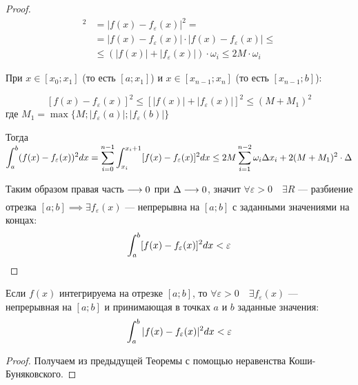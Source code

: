 \begin{proof}
    \begin{align*}
        [f(x) - f_\varepsilon(x)]^2 &= |f(x) - f_\varepsilon(x)|^2 = \\
        &= |f(x) - f_\varepsilon(x)| \cdot |f(x) - f_\varepsilon(x)| \leq \\ 
        &\leq (|f(x)| + |f_\varepsilon(x)|) \cdot \omega_i \leq 2 M \cdot \omega_i
    \end{align*}

    При $x \in [x_0; x_1]$ (то есть $[a; x_1]$) и 
    $x \in [x_{n - 1}; x_n]$ (то есть $[x_{n - 1}; b]$):

    \[ [f(x) - f_\varepsilon(x)]^2 \leq [|f(x)| + |f_\varepsilon(x)|]^2 \leq (M + M_1)^2 \]
    где $M_1 = \max \{ M; |f_\varepsilon(a)|; |f_\varepsilon(b)| \}$

    Тогда $\displaystyle\int_a^b (f(x) - f_\varepsilon(x))^2 dx = 
    \displaystyle\sum_{i = 0}^{n - 1} \displaystyle\int_{x_i}^{x_i + 1} [f(x) - f_\varepsilon(x)]^2 dx \leq
    2M \displaystyle\sum_{i = 1}^{n - 2} \omega_i \Delta x_i + 2(M + M_1)^2 \cdot \Delta$

    Таким образом правая часть $\underset{}{\longrightarrow} 0$ при $\Delta \underset{}{\longrightarrow} 0$,
    значит $\forall \varepsilon > 0 \quad \exists R$ --- разбиение отрезка
    $[a; b] \implies \exists f_\varepsilon(x)$ --- непрерывна на $[a; b]$ с
    заданными значениями на концах:
    \[ \displaystyle\int_a^b [f(x) - f_\varepsilon(x)]^2 dx < \varepsilon \]
\end{proof}

\begin{corollary}
    Если $f(x)$ интегрируема на отрезке $[a; b]$, то $\forall \varepsilon > 0
    \quad \exists f_\varepsilon(x)$ --- непрерывная на $[a; b]$ и принимающая
    в точках $a$ и $b$ заданные значения:
    \[ \displaystyle\int_a^b |f(x) - f_\varepsilon(x)|^2 dx < \varepsilon \]
\end{corollary}
\begin{proof}
    Получаем из предыдущей Теоремы с помощью неравенства Коши-Буняковского.
\end{proof}
